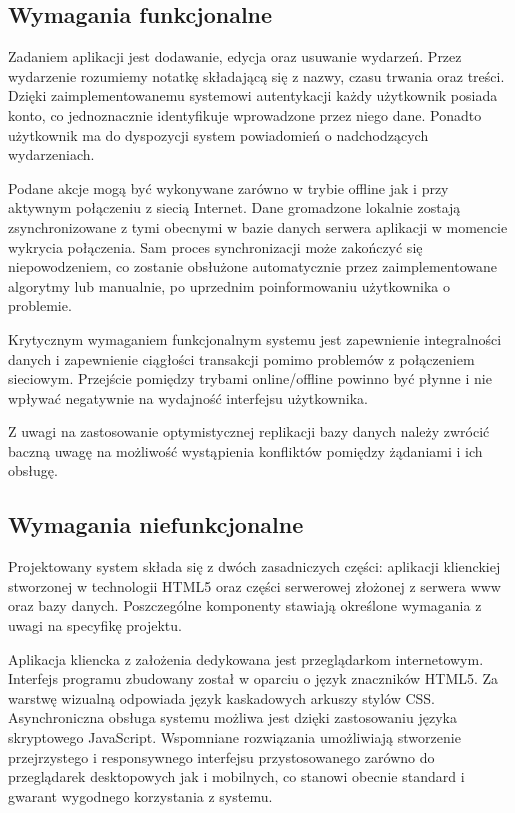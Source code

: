 \subsection{Wymagania funkcjonalne}
\label{sec:wymFunkcj}

Zadaniem aplikacji jest dodawanie, edycja oraz usuwanie wydarzeń. Przez wydarzenie rozumiemy notatkę składającą się z nazwy, czasu trwania oraz treści. Dzięki zaimplementowanemu systemowi autentykacji każdy użytkownik posiada konto, co jednoznacznie identyfikuje wprowadzone przez niego dane. Ponadto użytkownik ma do dyspozycji system powiadomień o nadchodzących wydarzeniach.

Podane akcje mogą być wykonywane zarówno w trybie offline jak i przy aktywnym połączeniu z siecią Internet. Dane gromadzone lokalnie zostają zsynchronizowane z tymi obecnymi w bazie danych serwera aplikacji w momencie wykrycia połączenia. Sam proces synchronizacji może zakończyć się niepowodzeniem, co zostanie obsłużone automatycznie przez zaimplementowane algorytmy lub manualnie, po uprzednim poinformowaniu użytkownika o problemie.

Krytycznym wymaganiem funkcjonalnym systemu jest zapewnienie integralności danych i zapewnienie ciągłości transakcji pomimo problemów z połączeniem sieciowym. Przejście pomiędzy trybami online/offline powinno być płynne i nie wpływać negatywnie na wydajność interfejsu użytkownika.

Z uwagi na zastosowanie optymistycznej replikacji bazy danych należy zwrócić baczną uwagę na możliwość wystąpienia konfliktów pomiędzy żądaniami i ich obsługę.

\subsection{Wymagania niefunkcjonalne}
\label{sec:wymNieFunkcj}

Projektowany system składa się z dwóch zasadniczych części: aplikacji klienckiej stworzonej w technologii HTML5 oraz części serwerowej złożonej z serwera www oraz bazy danych. Poszczególne komponenty stawiają określone wymagania z uwagi na specyfikę projektu.

Aplikacja kliencka z założenia dedykowana jest przeglądarkom internetowym. Interfejs programu zbudowany został w oparciu o język znaczników HTML5. Za warstwę wizualną odpowiada język kaskadowych arkuszy stylów CSS. Asynchroniczna obsługa systemu możliwa jest dzięki zastosowaniu języka skryptowego JavaScript. Wspomniane rozwiązania umożliwiają stworzenie przejrzystego i responsywnego interfejsu przystosowanego zarówno do przeglądarek desktopowych jak i mobilnych, co stanowi obecnie standard i gwarant wygodnego korzystania z systemu.

